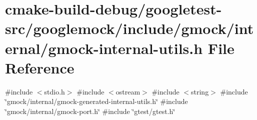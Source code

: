 \hypertarget{gmock-internal-utils_8h}{}\section{cmake-\/build-\/debug/googletest-\/src/googlemock/include/gmock/internal/gmock-\/internal-\/utils.h File Reference}
\label{gmock-internal-utils_8h}
{\ttfamily \#include $<$stdio.\+h$>$}\newline
{\ttfamily \#include $<$ostream$>$}\newline
{\ttfamily \#include $<$string$>$}\newline
{\ttfamily \#include \char`\"{}gmock/internal/gmock-\/generated-\/internal-\/utils.\+h\char`\"{}}\newline
{\ttfamily \#include \char`\"{}gmock/internal/gmock-\/port.\+h\char`\"{}}\newline
{\ttfamily \#include \char`\"{}gtest/gtest.\+h\char`\"{}}\newline
